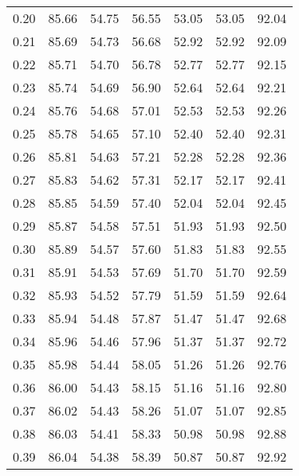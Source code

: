 \begin{tabular}{|c|c|c|c|c|c|c|}
      0.20 &     85.66 &     54.75 &      56.55 &   53.05 &      53.05 &         92.04 \\
      0.21 &     85.69 &     54.73 &      56.68 &   52.92 &      52.92 &         92.09 \\
      0.22 &     85.71 &     54.70 &      56.78 &   52.77 &      52.77 &         92.15 \\
      0.23 &     85.74 &     54.69 &      56.90 &   52.64 &      52.64 &         92.21 \\
      0.24 &     85.76 &     54.68 &      57.01 &   52.53 &      52.53 &         92.26 \\
      0.25 &     85.78 &     54.65 &      57.10 &   52.40 &      52.40 &         92.31 \\
      0.26 &     85.81 &     54.63 &      57.21 &   52.28 &      52.28 &         92.36 \\
      0.27 &     85.83 &     54.62 &      57.31 &   52.17 &      52.17 &         92.41 \\
      0.28 &     85.85 &     54.59 &      57.40 &   52.04 &      52.04 &         92.45 \\
      0.29 &     85.87 &     54.58 &      57.51 &   51.93 &      51.93 &         92.50 \\
      0.30 &     85.89 &     54.57 &      57.60 &   51.83 &      51.83 &         92.55 \\
      0.31 &     85.91 &     54.53 &      57.69 &   51.70 &      51.70 &         92.59 \\
      0.32 &     85.93 &     54.52 &      57.79 &   51.59 &      51.59 &         92.64 \\
      0.33 &     85.94 &     54.48 &      57.87 &   51.47 &      51.47 &         92.68 \\
      0.34 &     85.96 &     54.46 &      57.96 &   51.37 &      51.37 &         92.72 \\
      0.35 &     85.98 &     54.44 &      58.05 &   51.26 &      51.26 &         92.76 \\
      0.36 &     86.00 &     54.43 &      58.15 &   51.16 &      51.16 &         92.80 \\
      0.37 &     86.02 &     54.43 &      58.26 &   51.07 &      51.07 &         92.85 \\
      0.38 &     86.03 &     54.41 &      58.33 &   50.98 &      50.98 &         92.88 \\
      0.39 &     86.04 &     54.38 &      58.39 &   50.87 &      50.87 &         92.92 \\

\end{tabular}
